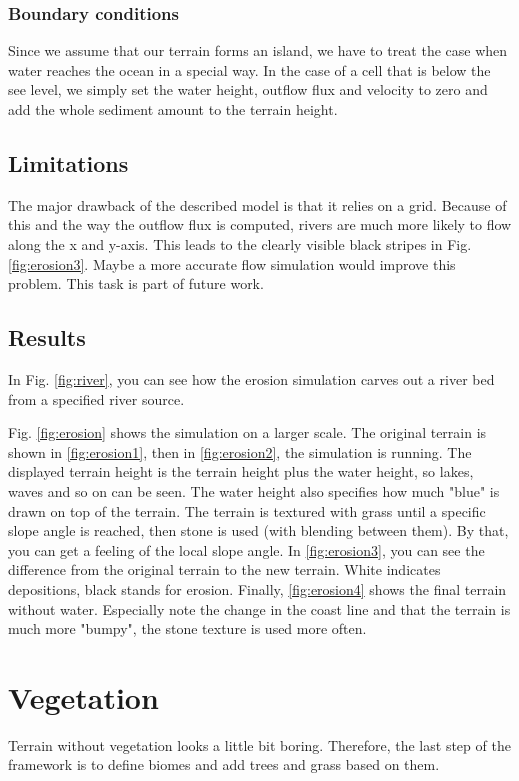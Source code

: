 \documentclass[journal, letterpaper]{IEEEtran}
\begin{document}
\subsubsection{Boundary conditions}
Since we assume that our terrain forms an island, we have to treat the case when water reaches the ocean in a special way.
In the case of a cell that is below the see level, we simply set the water height, outflow flux and velocity to zero and add the whole sediment amount to the terrain height.

\subsection{Limitations}
The major drawback of the described model is that it relies on a grid. Because of this and the way the outflow flux is computed, rivers are much more likely to flow along the x and y-axis. 
This leads to the clearly visible black stripes in Fig. \ref{fig:erosion3}. Maybe a more accurate flow simulation would improve this problem. This task is part of future work.

\subsection{Results}
In Fig. \ref{fig:river}, you can see how the erosion simulation carves out a river bed from a specified river source.

Fig. \ref{fig:erosion} shows the simulation on a larger scale. The original terrain is shown in \ref{fig:erosion1}, then in \ref{fig:erosion2}, the simulation is running. The displayed terrain height is the terrain height plus the water height, so lakes, waves and so on can be seen. The water height also specifies how much "blue" is drawn on top of the terrain. The terrain is textured with grass until a specific slope angle is reached, then stone is used (with blending between them). By that, you can get a feeling of the local slope angle. In \ref{fig:erosion3}, you can see the difference from the original terrain to the new terrain. White indicates depositions, black stands for erosion. Finally, \ref{fig:erosion4} shows the final terrain without water. Especially note the change in the coast line and that the terrain is much more "bumpy", the stone texture is used more often.

\section{Vegetation}\label{Vegetation}
Terrain without vegetation looks a little bit boring. Therefore, the last step of the framework is to define biomes and add trees and grass based on them.
\end{document}
